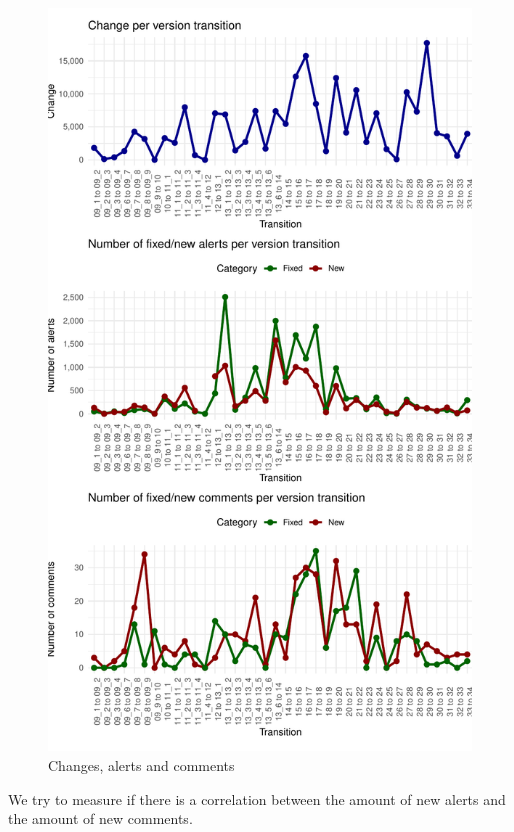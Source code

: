 \documentclass[
]{article}
\begin{document}
\begin{figure}
\centering
\includegraphics{report_files/figure-latex/unnamed-chunk-20-1.pdf}
\caption{\label{timeseries}Changes, alerts and comments}
\end{figure}

\normalsize

\newpage

We try to measure if there is a correlation between the amount of new
alerts and the amount of new comments.
\end{document}
